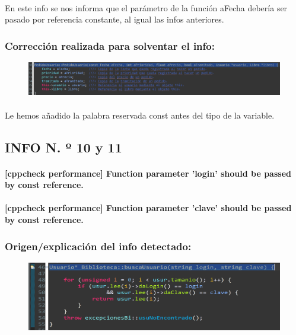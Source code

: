			\paragraph{}En este info se nos informa que el parámetro de la función aFecha debería ser pasado por referencia constante, al igual las infos anteriores.
			
		\subsubsection{Corrección realizada para solventar el info:}
		
			\begin{figure}[H]
				\centering
				\includegraphics[scale=0.55]{img/esteban15.png}
				\label{esteban15}
			\end{figure}
		
			\paragraph{}Le hemos añadido la palabra reservada const antes del tipo de la variable.
			
	\subsection{INFO N. º 10 y 11}
	
		\paragraph{[cppcheck performance] Function parameter 'login' should be passed by const reference.}
		
		\paragraph{[cppcheck performance] Function parameter 'clave' should be passed by const reference.}
	
		\subsubsection{Origen/explicación del info detectado:}
		
			\begin{figure}[H]
				\centering
				\includegraphics[scale=0.55]{img/esteban16.png}
				\label{esteban16}
			\end{figure}
		
